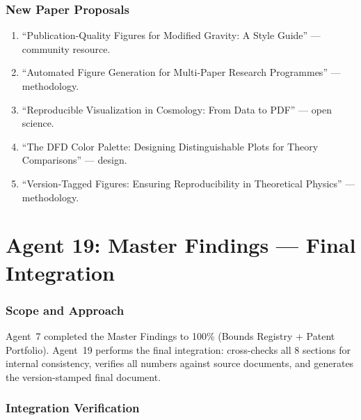 \documentclass[11pt,a4paper]{article}
\begin{document}
\section{New Paper Proposals}

\begin{enumerate}
\item ``Publication-Quality Figures for Modified Gravity: A Style Guide'' --- community resource.
\item ``Automated Figure Generation for Multi-Paper Research Programmes'' --- methodology.
\item ``Reproducible Visualization in Cosmology: From Data to PDF'' --- open science.
\item ``The DFD Color Palette: Designing Distinguishable Plots for Theory Comparisons'' --- design.
\item ``Version-Tagged Figures: Ensuring Reproducibility in Theoretical Physics'' --- methodology.
\end{enumerate}


\part{Agent 19: Master Findings --- Final Integration}
\label{part:master-integration}

\section{Scope and Approach}

Agent~7 completed the Master Findings to 100\% (Bounds Registry + Patent Portfolio). Agent~19 performs the final integration: cross-checks all 8 sections for internal consistency, verifies all numbers against source documents, and generates the version-stamped final document.

\section{Integration Verification}
\end{document}
